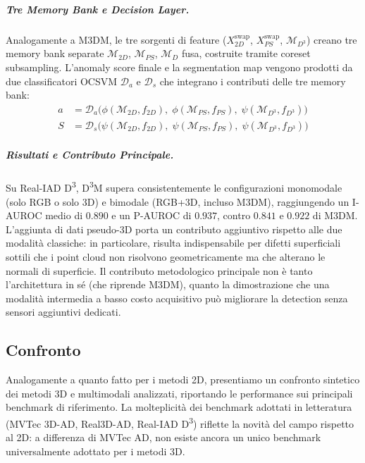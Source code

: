 \subparagraph{Tre Memory Bank e Decision Layer.}
Analogamente a M3DM, le tre sorgenti di feature ($X_{2D}^{\text{swap}}$, $X_{PS}^{\text{swap}}$, $\mathcal{M}_{D^3}$) creano tre memory bank separate $\mathcal{M}_{2D}$, $\mathcal{M}_{PS}$, $\mathcal{M}_{D}$ fusa, costruite tramite coreset subsampling. L'anomaly score finale e la segmentation map vengono prodotti da due classificatori OCSVM $\mathcal{D}_a$ e $\mathcal{D}_s$ che integrano i contributi delle tre memory bank:
\begin{align}
    a &= \mathcal{D}_a\bigl(\phi(\mathcal{M}_{2D}, f_{2D}),\; \phi(\mathcal{M}_{PS}, f_{PS}),\; 
        \psi(\mathcal{M}_{D^3}, f_{D^3})\bigr) \\
    S &= \mathcal{D}_s\bigl(\psi(\mathcal{M}_{2D}, f_{2D}),\; \psi(\mathcal{M}_{PS}, f_{PS}),\; 
        \psi(\mathcal{M}_{D^3}, f_{D^3})\bigr)
\end{align}

\subparagraph{Risultati e Contributo Principale.}
Su Real-IAD D\textsuperscript{3}, D\textsuperscript{3}M supera consistentemente le configurazioni monomodale (solo RGB o solo 3D) e bimodale (RGB+3D, incluso M3DM), raggiungendo un I-AUROC medio di $0.890$ e un P-AUROC di $0.937$, contro $0.841$ e $0.922$ di M3DM. L'aggiunta di dati pseudo-3D porta un contributo aggiuntivo rispetto alle due modalità classiche: in particolare, risulta indispensabile per difetti superficiali sottili che i point cloud non risolvono geometricamente ma che alterano le normali di superficie. Il contributo metodologico principale non è tanto l'architettura in sé (che riprende M3DM), quanto la dimostrazione che una modalità intermedia a basso costo acquisitivo può migliorare la detection senza sensori aggiuntivi dedicati.

\subsection{Confronto}

Analogamente a quanto fatto per i metodi 2D, presentiamo un confronto sintetico dei metodi 3D e multimodali analizzati, riportando le performance sui principali benchmark di riferimento. La molteplicità dei benchmark adottati in letteratura (MVTec 3D-AD, Real3D-AD, Real-IAD D\textsuperscript{3}) riflette la novità del campo rispetto al 2D: a differenza di MVTec AD, non esiste ancora un unico benchmark universalmente adottato per i metodi 3D.

